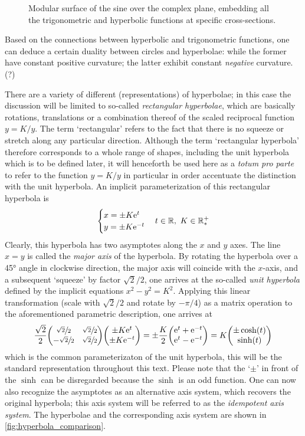 \begin{figure}[ht]
    \centering
    
    \caption{Modular surface of the sine over the complex plane, embedding all the trigonometric and hyperbolic functions at specific cross-sections.}
    \label{fig:modular_sine}
\end{figure}

Based on the connections between hyperbolic and trigonometric functions, one can deduce a certain duality between circles and hyperbolae: while the former have constant positive curvature; the latter exhibit constant \emph{negative} curvature.(?)

There are a variety of different (representations) of hyperbolae; in this case the discussion will be limited to so-called \emph{rectangular hyperbolae}, which are basically rotations, translations or a combination thereof of the scaled reciprocal function $y = K/y$. The term `rectangular' refers to the fact that there is no squeeze or stretch along any particular direction. Although the term `rectangular hyperbola' therefore corresponds to a whole range of shapes, including the unit hyperbola which is to be defined later, it will henceforth be used here as a \emph{totum pro parte} to refer to the function $y = K/y$ in particular in order accentuate the distinction with the unit hyperbola. An implicit parameterization of this rectangular hyperbola is 
$$ 
    \begin{cases}
        x =  \pm K\mathrm{e}^t\\
        y = \pm K\mathrm{e}^{-t}\\
    \end{cases} t \in \mathbb{R},\ K \in \mathbb{R}^+_*
$$
Clearly, this hyperbola has two asymptotes along the $x$ and $y$ axes. The line $x = y$ is called the \emph{major axis} of the hyperbola. By rotating the hyperbola over a \ang{45} angle in clockwise direction, the major axis will coincide with the $x$-axis, and a subsequent `squeeze' by factor $\sqrt{2}/2$, one arrives at the so-called \emph{unit hyperbola} defined by the implicit equations $x^2 - y^2 = K^2$. Applying this linear transformation (scale with $\sqrt{2}/2$ and rotate by $-\pi/4$) as a matrix operation to the aforementioned parametric description, one arrives at 
$$
  \frac{\sqrt{2}}{2}\mqty(\sfrac{\sqrt{2}}{2} & \sfrac{\sqrt{2}}{2} \\ -\sfrac{\sqrt{2}}{2} & \sfrac{\sqrt{2}}{2})\mqty(\pm K\ec^t\\\pm K\ec^{-t}) 
  = \pm\frac{K}{2}\mqty(\ec^t + \ec^{-t}\\ \ec^{t} - \ec^{-t}) 
  = K\mqty(\pm \cosh(t)\\\sinh(t))
$$
which is the common parameterizaton of the unit hyperbola, this will be the standard representation throughout this text. Please note that the `$\pm$' in front of the $\sinh$ can be disregarded because the $\sinh$ is an odd function. One can now also recognize the asymptotes as an alternative axis system, which recovers the original hyperbola; this axis system will be referred to as the \emph{idempotent axis system}. The hyperbolae and the corresponding axis system are shown in \cref{fig:hyperbola_comparison}.

